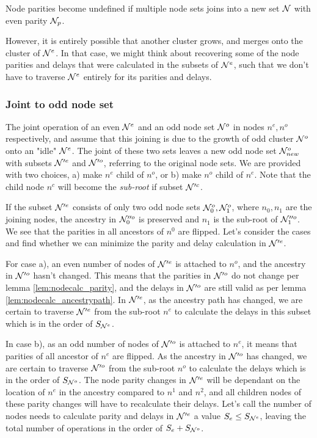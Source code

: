 \begin{lemma}\label{lem:nodecalc_even}
  Node parities become undefined if multiple node sets joins into a new set $\mathcal{N}$ with even parity $\mathcal{N}_p$.
\end{lemma}

However, it is entirely possible that another cluster grows, and merges onto the cluster of $\mathcal{N}^{e}$. In that case, we might think about recovering some of the node parities and delays that were calculated in the subsets of $\mathcal{N}^e$, such that we don't have to traverse $\mathcal{N}^{e}$ entirely for its parities and delays.

\subsubsection{Joint to odd node set}

The joint operation of an even $\mathcal{N}^e$ and an odd node set $\mathcal{N}^o$ in nodes $n^e, n^o$ respectively, and assume that this joining is due to the growth of odd cluster $\mathcal{N}^o$ onto an "idle" $\mathcal{N}^e$. The joint of these two sets leaves a new odd node set $\mathcal{N}_{new}^o$ with subsets $\mathcal{N}'^e$ and $\mathcal{N}'^o$, referring to the original node sets. We are provided with two choices, a) make $n^e$ child of $n^o$, or b) make $n^o$ child of $n^e$. Note that the child node $n^c$ will become the \emph{sub-root} if subset $\mathcal{N}'^c$.

If the subset $\mathcal{N}'^e$ consists of only two odd node sets $\mathcal{N}^o_0, \mathcal{N}^o_1$, where $n_0, n_1$ are the joining nodes, the ancestry in $\mathcal{N}''^o_0$ is preserved and $n_1$ is the sub-root of $\mathcal{N}''^o_1$. We see that the parities in all ancestors of $n^0$ are flipped. Let's consider the cases and find whether we can minimize the parity and delay calculation in $\mathcal{N}'^{e}$.

For case a), an even number of nodes of $\mathcal{N}'^e$ is attached to $n^o$, and the ancestry in $\mathcal{N}'^o$ hasn't changed. This means that the parities in $\mathcal{N}'^o$ do not change per lemma \ref{lem:nodecalc_parity}, and the delays in $\mathcal{N}'^o$ are still valid as per lemma \ref{lem:nodecalc_ancestrypath}. In $\mathcal{N}'^e$, as the ancestry path has changed, we are certain to traverse $\mathcal{N}'^e$ from the sub-root $n^e$ to calculate the delays in this subset which is in the order of $S_{\mathcal{N}^e}$.

In case b), as an odd number of nodes of $\mathcal{N}'^o$ is attached to $n^e$, it means that parities of all ancestor of $n^e$ are flipped. As the ancestry in $\mathcal{N}'^{o}$ has changed, we are certain to traverse $\mathcal{N}'^o$ from the sub-root $n^o$ to calculate the delays which is in the order of $S_{\mathcal{N}^o}$. The node parity changes in $\mathcal{N}'^e$ will be dependant on the location of $n^e$ in the ancestry compared to $n^1$ and $n^2$, and all children nodes of these parity changes will have to recalculate their delays. Let's call the number of nodes needs to calculate parity and delays in $\mathcal{N}'^e$ a value $S_e \leq S_{\mathcal{N}^e}$, leaving the total number of operations in the order of $S_e + S_{\mathcal{N}^o}$.

